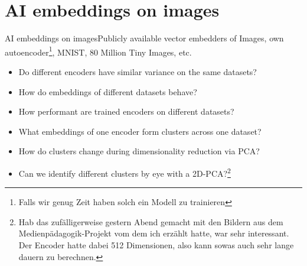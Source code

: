     \section{AI embeddings on images}
    \begin{frame}{AI embeddings on images}{Publicly available vector embedders of Images, own autoencoder\footnote{Falls wir genug Zeit haben solch ein Modell zu trainieren}, MNIST, 80 Million Tiny Images, etc.}
        \begin{itemize}[<+->]
            \item Do different encoders have similar variance on the same datasets?
            \item How do embeddings of different datasets behave?
            \item How performant are trained encoders on different datasets?
            \item What embeddings of one encoder form clusters across one dataset?
            \item How do clusters change during dimensionality reduction via PCA?
            \item Can we identify different clusters by eye with a 2D-PCA?\footnote{Hab das zufälligerweise gestern Abend gemacht mit den Bildern aus dem Medienpädagogik-Projekt vom dem ich erzählt hatte, war sehr interessant. Der Encoder hatte dabei 512 Dimensionen, also kann sowas auch sehr lange dauern zu berechnen.}
        \end{itemize}
    \end{frame}

